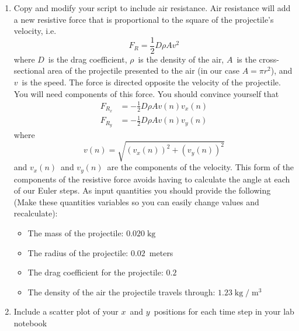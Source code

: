 \documentclass[twoside,11pt,ShortChapTitles]{BYUTextbook}
\begin{document}
\begin{enumerate}
\item {\small Copy and modify your script to include air resistance. Air
resistance will add a new resistive force that is proportional to the square
of the projectile's velocity, i.e. } \[
F_{R}=\frac{1}{2}D\rho Av^{2}
\]
{\small where }$D${\small \ is the drag coefficient, }$\rho${\small \ is the
density of the air, }$A${\small \ is the cross-sectional area of the
projectile presented to the air (in our case }$A=\pi r^{2}${\small ), and }$v
${\small \ is the speed. The force is directed opposite the velocity of the
projectile. You will need components of this force. You should convince
yourself that } \begin{align*}
F_{R_{x}}  & =-\frac{1}{2}D\rho Av\left(  n\right)  v_{x}\left(  n\right) \\
F_{R_{y}}  & =-\frac{1}{2}D\rho Av\left(  n\right)  v_{y}\left(  n\right)
\end{align*}
{\small where } \[
v\left(  n\right)  =\sqrt{\left(  v_{x}\left(  n\right)  \right)  ^{2}+\left(
v_{y}\left(  n\right)  \right)  ^{2}}
\]
{\small and }$v_{x}\left(  n\right)  ${\small \ and }$v_{y}\left(  n\right)
${\small \ are the components of the velocity. This form of the components of
the resistive force avoids having to calculate the angle at each of our Euler
steps. As input quantities you should provide the following (Make these
quantities variables so you can easily change values and recalculate):}

\begin{itemize}
\item {\small The mass of the projectile:}
$0.020 \operatorname{kg} $

\item {\small The radius of the projectile:}
$0.02${\small \ meters}

\item {\small The drag coefficient for the projectile:}
$0.2$

\item {\small The density of the air the projectile travels through:}
$1.23 \operatorname{kg} / \operatorname{m} ^{3}$
\end{itemize}

\item {\small Include a scatter plot of your }$x${\small \ and } $y${\small \ positions for each time step in your lab notebook}
\end{enumerate}
\end{document}
